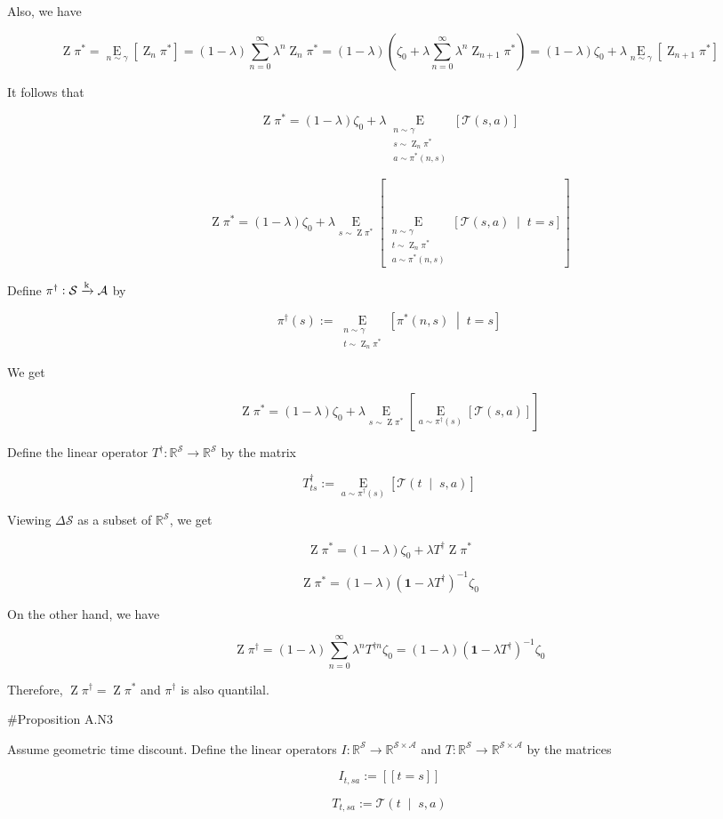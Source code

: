 \documentclass[a4paper]{article}
\newcommand{\AP}[1]{\left(#1\right)}
\newcommand{\AB}[1]{\left[#1\right]}
\newcommand{\APM}[2]{\left(#1\;\middle\vert\;#2\right)}
\newcommand{\ABM}[2]{\left[#1\;\middle\vert\;#2\right]}
\newcommand{\Ea}[2]{\underset{#1}{\operatorname{E}}\AB{#2}}
\newcommand{\CE}[3]{\underset{#1}{\operatorname{E}}\ABM{#2}{#3}}
\newcommand{\Reals}{\mathbb{R}}
\newcommand{\K}{\xrightarrow{\textnormal{k}}}
\newcommand{\A}{\mathcal{A}}
\newcommand{\St}{\mathcal{S}}
\newcommand{\T}{\mathcal{T}}
\DeclareMathOperator{\Z}{Z}
\begin{document}
Also, we have

$$\Z\pi^* = \Ea{n\sim\gamma}{\Z_n \pi^*} = (1-\lambda)\sum_{n=0}^\infty \lambda^n \Z_n \pi^* = (1-\lambda)\AP{\zeta_0 + \lambda \sum_{n=0}^\infty \lambda^n \Z_{n+1}\pi^*}=(1-\lambda)\zeta_0 + \lambda \Ea{n\sim\gamma}{\Z_{n+1}{\pi^*}}$$

It follows that

$$\Z\pi^* = (1-\lambda)\zeta_0 + \lambda \Ea{\substack{n\sim\gamma\\s\sim\Z_n{\pi^*}\\a\sim\pi^*\AP{n,s}}}{\T(s,a)}$$

$$\Z\pi^* = (1-\lambda)\zeta_0 + \lambda \Ea{s\sim\Z\pi^*}{\CE{\substack{n\sim\gamma\\t\sim\Z_n\pi^*\\a\sim\pi^*(n,s)}}{\T(s,a)}{t=s}}$$

Define $\pi^\dagger: \St \K \A$ by

$$\pi^\dagger(s) := \CE{\substack{n\sim\gamma\\t\sim\Z_n\pi^*}}{\pi^*(n,s)}{t=s}$$

We get

$$\Z\pi^* = (1-\lambda)\zeta_0 + \lambda \Ea{s\sim\Z\pi^*}{\Ea{a\sim\pi^\dagger(s)}{\T(s,a)}}$$

Define the linear operator $T^\dagger: \Reals^\St \rightarrow \Reals^\St$ by the matrix 

$$T^\dagger_{ts} := \Ea{a\sim\pi^\dagger(s)}{\T\APM{t}{s,a}}$$

Viewing $\Delta\St$ as a subset of $\Reals^\St$, we get

$$\Z\pi^* = (1-\lambda)\zeta_0 + \lambda T^\dagger\Z\pi^*$$

$$\Z\pi^* = (1-\lambda)\AP{\boldsymbol{1}-\lambda T^\dagger}^{-1}\zeta_0$$

On the other hand, we have

$$\Z\pi^\dagger = (1-\lambda)\sum_{n=0}^\infty \lambda^n T^{\dagger n} \zeta_0 = (1-\lambda)\AP{\boldsymbol{1}-\lambda T^\dagger}^{-1}\zeta_0$$

Therefore, $\Z\pi^\dagger = \Z\pi^*$ and $\pi^\dagger$ is also quantilal.

\#Proposition A.N3

Assume geometric time discount. Define the linear operators $I: \Reals^\St \rightarrow \Reals^{\St\times\A}$ and $T: \Reals^\St \rightarrow \Reals^{\St\times\A}$ by the matrices

$$I_{t,sa}:=[[t=s]]$$

$$T_{t,sa}:=\T\APM{t}{s,a}$$
\end{document}
